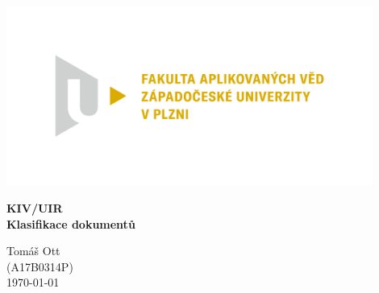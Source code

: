 \documentclass[ 12pt, a4paper]{article}
\begin{document}
\def\code#1{\texttt{#1}}

%
\centerline{\includegraphics[width=12cm]{logo.png}}
\vspace*{50px}
\begin{center}
	{\LARGE\bf\noindent KIV/UIR \\ Klasifikace dokumentů}\\
	\vspace*{40px}  
	
	Tomáš Ott\\
	(A17B0314P)\\
	\vspace*{\fill}  
	\hspace*{\fill} \today \\
\end{center}
\newpage
\tableofcontents
\newpage
\end{document}
